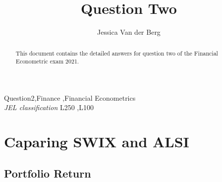 \documentclass[11pt,preprint, authoryear]{elsarticle}
\numberwithin{equation}{section}
\numberwithin{figure}{section}
\numberwithin{table}{section}
\begin{document}
\begin{frontmatter}  %

\title{Question Two}





\author[Add1]{Jessica Van der Berg}





\address[Add1]{Financial Econometrics, 2021}


\begin{abstract}
\small{
This document contains the detailed answers for question two of the
Financial Econometric exam 2021.
}
\end{abstract}

\vspace{1cm}


\begin{keyword}
\footnotesize{
Question2\sep Finance \sep Financial Econometrics \\
\vspace{0.3cm}
}
\footnotesize{
\textit{JEL classification} L250 \sep L100
}
\end{keyword}



\vspace{0.5cm}

\end{frontmatter}



\pagestyle{fancy}
\chead{}
\rhead{}
\lfoot{}
\lhead{}
\cfoot{}


\headsep 35pt %




\hypertarget{caparing-swix-and-alsi}{%
\section{Caparing SWIX and ALSI}\label{caparing-swix-and-alsi}}

\hypertarget{portfolio-return}{%
\subsection{Portfolio Return}\label{portfolio-return}}
\end{document}
